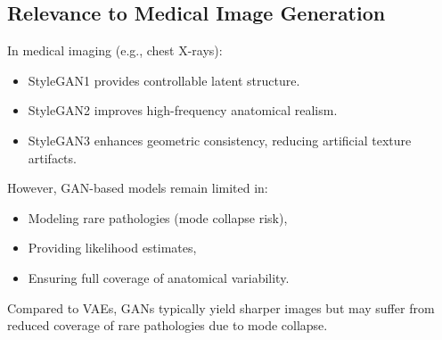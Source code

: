 \subsection{Relevance to Medical Image Generation}

In medical imaging (e.g., chest X-rays):

\begin{itemize}
    \item StyleGAN1 provides controllable latent structure.
    \item StyleGAN2 improves high-frequency anatomical realism.
    \item StyleGAN3 enhances geometric consistency, reducing artificial texture artifacts.
\end{itemize}

However, GAN-based models remain limited in:

\begin{itemize}
    \item Modeling rare pathologies (mode collapse risk),
    \item Providing likelihood estimates,
    \item Ensuring full coverage of anatomical variability.
\end{itemize}

Compared to VAEs, GANs typically yield sharper images but may suffer from reduced coverage of rare pathologies due to mode collapse. 
